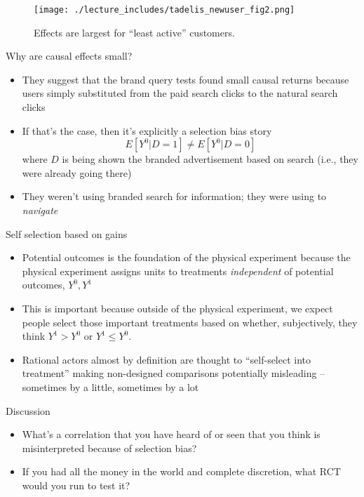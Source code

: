 \documentclass{beamer}
\begin{document}
\begin{frame}

\begin{figure}
\begin{center}
\texttt{[image: ./lecture\_includes/tadelis\_newuser\_fig2.png]}
\caption{Effects are largest for ``least active'' customers. }
\end{center}
\end{figure}

\end{frame}


\begin{frame}{Why are causal effects small?}

\begin{itemize}
\item They suggest that the brand query tests found small causal returns because users simply substituted from the paid search clicks to the natural search clicks
\item If that's the case, then it's explicitly a selection bias story $$E[Y^0|D=1] \neq E[Y^0|D=0]$$ where $D$ is being shown the branded advertisement based on search (i.e., they were already going there)
\item They weren't using branded search for information; they were using to \emph{navigate}
\end{itemize}

\end{frame}

\begin{frame}{Self selection based on gains}

\begin{itemize}
\item Potential outcomes is the foundation of the physical experiment because the physical experiment assigns units to treatments \emph{independent} of potential outcomes, $Y^0,Y^1$
\item This is important because outside of the physical experiment, we expect people select those important treatments based on whether, subjectively, they think $Y^1>Y^0$ or $Y^1\leq Y^0$. 
\item Rational actors almost by definition are thought to ``self-select into treatment'' making non-designed comparisons potentially misleading -- sometimes by a little, sometimes by a lot
\end{itemize}

\end{frame}


\begin{frame}{Discussion}

\begin{itemize}
\item What's a correlation that you have heard of or seen that you think is misinterpreted because of selection bias?
\item If you had all the money in the world and complete discretion, what RCT would you run to test it?
\end{itemize}

\end{frame}
\end{document}
